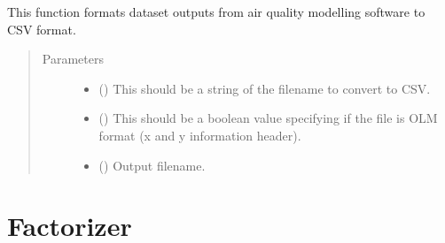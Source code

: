 \documentclass[letterpaper,10pt,english,openany,oneside]{sphinxmanual}
\begin{document}
\begin{fulllineitems}
\label{\detokenize{index:CSVFormatter.csvformatter}}
This function formats dataset outputs from air quality modelling software to CSV format.
\begin{quote}\begin{description}
\item[{Parameters}] \leavevmode\begin{itemize}
\item {} 
 () \textendash{} This should be a string of the filename to convert to CSV.

\item {} 
 () \textendash{} This should be a boolean value specifying if the file is OLM format (x and y information header).

\item {} 
 () \textendash{} Output filename.

\end{itemize}

\end{description}\end{quote}

\end{fulllineitems}



\chapter{Factorizer}
\label{\detokenize{index:factorizer}}\label{\detokenize{index:module-Factorizer}}
\end{document}
